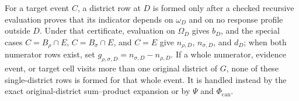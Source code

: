 For a target event \(C\), a district row at \(D\) is formed only after a checked recursive evaluation proves that its indicator depends on \(\omega_D\) and on no response profile outside \(D\).  Under that certificate, evaluation on \(\Omega_D\) gives \(b_D\), and the special cases \(C=B_\rho\cap E\), \(C=B_\sigma\cap E\), and \(C=E\) give \(n_{\rho,D}\), \(n_{\sigma,D}\), and \(d_D\); when both numerator rows exist, set \(g_{\rho,\sigma,D}=n_{\sigma,D}-n_{\rho,D}\).  If a whole numerator, evidence event, or target cell visits more than one original district of \(G\), none of these single-district rows is formed for that whole event.  It is handled instead by the exact original-district sum--product expansion or by \(\Psi\) and \(\Phi_{\mathrm{can}}\).